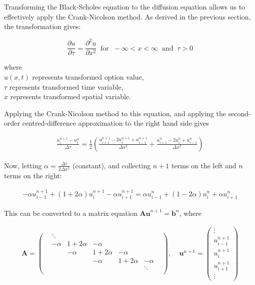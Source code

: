 \documentclass[11pt]{article}
\begin{document}
Transforming the Black-Scholes equation to the diffusion equation allows us to effectively apply the Crank-Nicolson method. As derived in the previous section, the transformation gives:

\[
\frac{\partial u}{\partial \tau} = \frac{\partial^2 u}{\partial x^2} \;\; \text{for} \;\; -\infty < x < \infty \;\; \text{and} \;\; \tau >0
\]

where \\

$u(x,t)$ represents transformed option value,\\
$\tau$ represents transformed time variable,\\
$x$ represents transformed spatial variable.

Applying the Crank-Nicolson method to this equation, and applying the second-order centred-difference approximation to the right hand side gives

\begin{align*}
    \frac{u_i^{n+1}-u_i^n}{\Delta \tau}=\frac{1}{2}\left(\frac{u_{i+1}^{n+1}-2u_i^{n+1}+u_{i-1}^{n+1}}{\Delta x^2}+\frac{u_{i+1}^{n}-2u_i^{n}+u_{i-1}^{n}}{\Delta x^2}\right)
\end{align*}

Now, letting $\alpha =\frac{\Delta\tau}{2\Delta x^2}$ (constant), and collecting $n+1$ terms on the left and $n$ terms on the right:

\begin{align*}
    -\alpha u_{i-1}^{n+1}+(1+2\alpha )u_i^{n+1}-\alpha u_{i+1}^{n+1}=\alpha u_{i-1}^n+(1-2\alpha )u_i^n+\alpha u_{i+1}^n
\end{align*}

This can be converted to a matrix equation $\mathbf{Au}^{n+1}=\mathbf{b}^n$, where

\begin{align*}
    \mathbf{A}=\left(\begin{array}{ccccccc}
        & \ddots & & & & & \\
        & -\alpha  & 1+2\alpha  & -\alpha  & & &\\
        & & -\alpha  & 1+2\alpha  & -\alpha  & &\\
        & & & -\alpha  & 1+2\alpha  & -\alpha  & \\
        & & & & & \ddots &\\
    \end{array}\right),\;\;\;\; \mathbf{u}^{n+1}=\left(\begin{array}{c}
        \vdots \\
        u_{i-1}^{n+1}\\
        u_{i}^{n+1}\\
        u_{i+1}^{n+1}\\
        \vdots
    \end{array}\right)
\end{align*}
\end{document}
